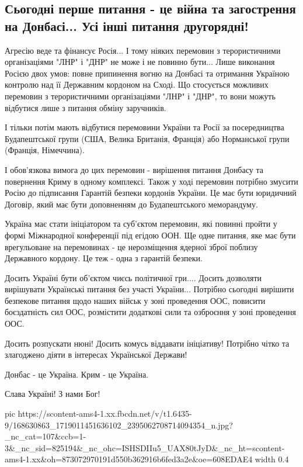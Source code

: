  
 
 
 
 

\subsection{Сьогодні перше питання - це війна та загострення на Донбасі... Усі інші питання другорядні! }

Агресію веде та фінансує Росія... І тому ніяких перемовин з терористичними
організаціями "ЛНР" і "ДНР"  не може і не повинно бути... Лише виконання Росією
двох умов: повне припинення вогню на Донбасі та отримання Україною контролю над
її Державним  кордоном на Сході.  Що стосується можливих перемовин з
терористичними організаціями "ЛНР" і "ДНР", то  вони можуть відбутися лише з
питання обміну заручників. 

І тільки потім мають відбутися перемовини України та Росії за посередництва
Будапештської групи (США, Велика Британія, Франція)  або Норманської групи
(Франція, Німеччина). 

І обов'язкова вимога до цих перемовин - вирішення питання Донбасу та повернення
Криму в одному комплексі.  Також у ході перемовин потрібно змусити Росію до
підписання Гарантій безпеки кордонів України. Це має бути юридичний Договір,
який має бути доповненням до Будапештського меморандуму. 

Україна має стати ініціатором та суб'єктом перемовин, які повинні пройти у
формі Міжнародної конференції під егідою ООН.  Ще одне питання, яке має бути
врегульоване на перемовинах - це нерозміщення ядерної зброї поблизу Державного
кордону. Це теж - одна з гарантій безпеки.   

Досить Україні бути об'єктом чиєсь політичної гри.... Досить дозволяти
вирішувати Українські питання без участі України... Потрібно сьогодні вирішити
безпекове питання щодо наших військ у зоні проведення ООС, повисити
боєздатність сил ООС, розмістити додаткові сили та озброєння у зоні проведення
ООС.  

Досить розпускати нюні! Досить комусь віддавати ініціативу! Потрібно чітко та
злагоджено діяти в інтересах Української Держави!    

Донбас - це Україна. Крим - це Україна.

Слава Україні! З нами Бог!

\ifcmt
  pic https://scontent-ams4-1.xx.fbcdn.net/v/t1.6435-9/168630863_1719011451636102_2395062708714094354_n.jpg?_nc_cat=107&ccb=1-3&_nc_sid=825194&_nc_ohc=ISHSDIIu5_UAX80tJyD&_nc_ht=scontent-ams4-1.xx&oh=873072970191d550b362916b6fed3a2e&oe=608EDAE4
  width 0.4
\fi


